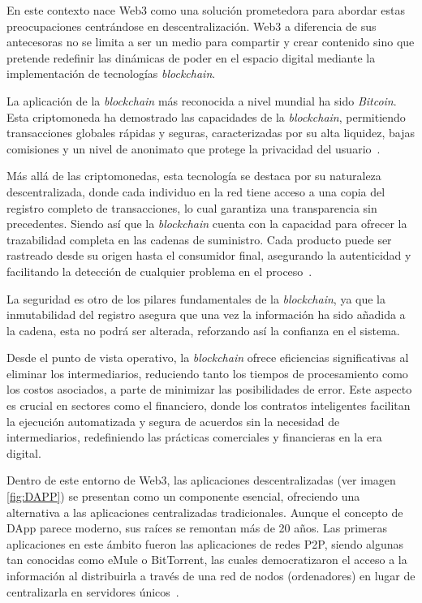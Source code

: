 En este contexto nace Web3 como una solución prometedora para abordar estas preocupaciones centrándose en descentralización. Web3 a diferencia de sus antecesoras no se limita a ser un medio para compartir y crear contenido sino que pretende redefinir las dinámicas de poder en el espacio digital mediante la implementación de tecnologías \textit{blockchain}.

La aplicación de la \textit{blockchain} más reconocida a nivel mundial ha sido \textit{Bitcoin}. Esta criptomoneda ha demostrado las capacidades de la \textit{blockchain}, permitiendo transacciones globales rápidas y seguras, caracterizadas por su alta liquidez, bajas comisiones y un nivel de anonimato que protege la privacidad del usuario~\cite{introducciónBitcoin}.

Más allá de las criptomonedas, esta tecnología se destaca por su naturaleza descentralizada, donde cada individuo en la red tiene acceso a una copia del registro completo de transacciones, lo cual garantiza una transparencia sin precedentes. Siendo así que la \textit{blockchain} cuenta con la capacidad para ofrecer la trazabilidad completa en las cadenas de suministro. Cada producto puede ser rastreado desde su origen hasta el consumidor final, asegurando la autenticidad y facilitando la detección de cualquier problema en el proceso~\cite{introducciónBlockchain}.

La seguridad es otro de los pilares fundamentales de la \textit{blockchain}, ya que la inmutabilidad del registro asegura que una vez la información ha sido añadida a la cadena, esta no podrá ser alterada, reforzando así la confianza en el sistema. 

Desde el punto de vista operativo, la \textit{blockchain} ofrece eficiencias significativas al eliminar los intermediarios, reduciendo tanto los tiempos de procesamiento como los costos asociados, a parte de minimizar las posibilidades de error.
Este aspecto es crucial en sectores como el financiero, donde los contratos inteligentes facilitan la ejecución automatizada y segura de acuerdos sin la necesidad de intermediarios, redefiniendo las prácticas comerciales y financieras en la era digital.

Dentro de este entorno de Web3, las aplicaciones descentralizadas (ver imagen \ref{fig:DAPP}) se presentan como un componente esencial, ofreciendo una alternativa a las aplicaciones centralizadas tradicionales. 
Aunque el concepto de DApp parece moderno, sus raíces se remontan más de 20 años. Las primeras aplicaciones en este ámbito fueron las aplicaciones de redes P2P, siendo algunas tan conocidas como eMule o BitTorrent, las cuales democratizaron el acceso a la información al distribuirla a través de una red de nodos (ordenadores) en lugar de centralizarla en servidores únicos~\cite{DApps}.

